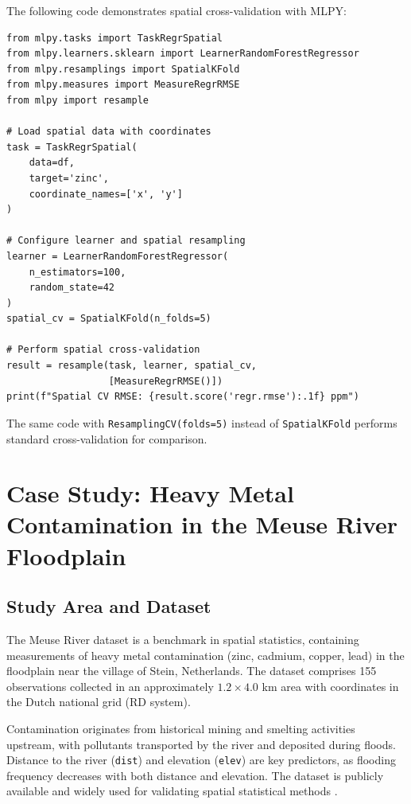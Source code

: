 \documentclass[a4paper,fleqn]{cas-sc}
\begin{document}
The following code demonstrates spatial cross-validation with MLPY:

\begin{verbatim}
from mlpy.tasks import TaskRegrSpatial
from mlpy.learners.sklearn import LearnerRandomForestRegressor
from mlpy.resamplings import SpatialKFold
from mlpy.measures import MeasureRegrRMSE
from mlpy import resample

# Load spatial data with coordinates
task = TaskRegrSpatial(
    data=df,
    target='zinc',
    coordinate_names=['x', 'y']
)

# Configure learner and spatial resampling
learner = LearnerRandomForestRegressor(
    n_estimators=100,
    random_state=42
)
spatial_cv = SpatialKFold(n_folds=5)

# Perform spatial cross-validation
result = resample(task, learner, spatial_cv,
                  [MeasureRegrRMSE()])
print(f"Spatial CV RMSE: {result.score('regr.rmse'):.1f} ppm")
\end{verbatim}

The same code with \texttt{ResamplingCV(folds=5)} instead of \texttt{SpatialKFold} performs standard cross-validation for comparison.


\section{Case Study: Heavy Metal Contamination in the Meuse River Floodplain}
\label{sec:case-study}

\subsection{Study Area and Dataset}

The Meuse River dataset \citep{rikken1996geostatistics} is a benchmark in spatial statistics, containing measurements of heavy metal contamination (zinc, cadmium, copper, lead) in the floodplain near the village of Stein, Netherlands. The dataset comprises 155 observations collected in an approximately $1.2 \times 4.0$ km area with coordinates in the Dutch national grid (RD system).

Contamination originates from historical mining and smelting activities upstream, with pollutants transported by the river and deposited during floods. Distance to the river (\texttt{dist}) and elevation (\texttt{elev}) are key predictors, as flooding frequency decreases with both distance and elevation. The dataset is publicly available and widely used for validating spatial statistical methods \citep{pebesma2004multivariable}.
\end{document}
